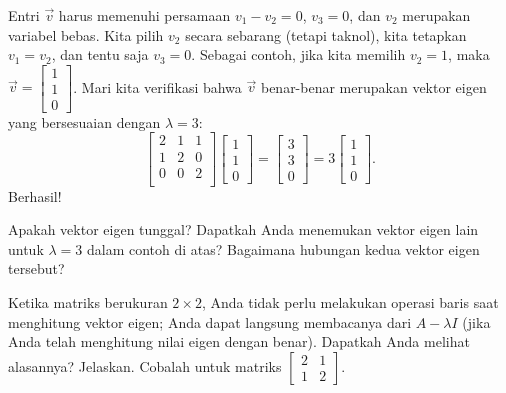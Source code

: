 \begin{example}
Entri $\vec{v}$ harus memenuhi persamaan
$v_1 - v_2 = 0$, $v_3 = 0$, dan $v_2$ merupakan variabel bebas.
Kita pilih $v_2$ secara sebarang (tetapi taknol), kita tetapkan
$v_1 = v_2$, dan tentu saja $v_3 = 0$.
Sebagai contoh, jika kita memilih $v_2 = 1$, maka
$\vec{v} =
\left[ \begin{smallmatrix} 1 \\ 1 \\ 0 \end{smallmatrix} \right]$.
Mari kita verifikasi bahwa $\vec{v}$ benar-benar merupakan vektor eigen yang bersesuaian dengan $\lambda = 3$:
\begin{equation*}
\begin{bmatrix}
2 & 1 & 1 \\
1 & 2 & 0 \\
0 & 0 & 2 \\
\end{bmatrix}
\begin{bmatrix}
1 \\
1 \\
0
\end{bmatrix}
=
\begin{bmatrix}
3 \\
3 \\
0
\end{bmatrix}
=
3
\begin{bmatrix}
1 \\
1 \\
0
\end{bmatrix} .
\end{equation*}
Berhasil!
\end{example}

\begin{exercise}[mudah]
Apakah vektor eigen tunggal?  Dapatkah Anda menemukan vektor eigen lain untuk
$\lambda = 3$ dalam contoh di atas?  Bagaimana hubungan kedua vektor eigen tersebut?
\end{exercise}

\begin{exercise}
Ketika matriks berukuran $2 \times 2$, Anda tidak perlu
melakukan operasi baris saat menghitung vektor eigen;
Anda dapat langsung membacanya dari $A-\lambda I$
(jika Anda telah menghitung nilai eigen dengan benar).
Dapatkah Anda melihat alasannya?  Jelaskan.  Cobalah untuk matriks
$\left[ \begin{smallmatrix} 2 & 1 \\ 1 & 2 \end{smallmatrix} \right]$.
\end{exercise}

